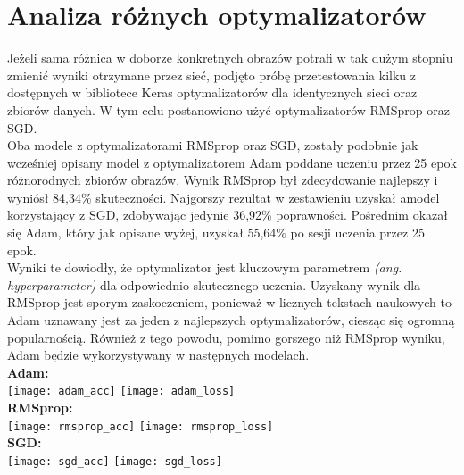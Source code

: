 \section{Analiza różnych optymalizatorów}
Jeżeli sama różnica w doborze konkretnych obrazów potrafi w tak dużym stopniu zmienić wyniki
otrzymane przez sieć, podjęto próbę przetestowania kilku z dostępnych w bibliotece Keras
optymalizatorów dla identycznych sieci oraz zbiorów danych. W tym celu postanowiono użyć
optymalizatorów RMSprop oraz SGD.\\
Oba modele z optymalizatorami RMSprop oraz SGD, zostały podobnie jak wcześniej opisany model
z optymalizatorem Adam poddane uczeniu przez 25 epok różnorodnych zbiorów obrazów. Wynik RMSprop
był zdecydowanie najlepszy i wyniósł 84,34\% skuteczności. Najgorszy rezultat w zestawieniu
uzyskał amodel korzystający z SGD, zdobywając jedynie 36,92\% poprawności. Pośrednim okazał
się Adam, który jak opisane wyżej, uzyskał 55,64\% po sesji uczenia przez 25 epok.\\
Wyniki te dowiodły, że optymalizator jest kluczowym parametrem \textit{(ang. hyperparameter)}
dla odpowiednio skutecznego uczenia. Uzyskany wynik dla RMSprop jest sporym zaskoczeniem,
ponieważ w licznych tekstach naukowych to Adam uznawany jest za jeden z najlepszych
optymalizatorów, ciesząc się ogromną popularnością. Również z tego powodu, pomimo
gorszego niż RMSprop wyniku, Adam będzie wykorzystywany w następnych modelach.\\
\textbf{Adam:}\\
\texttt{[image: adam\_acc]}
\texttt{[image: adam\_loss]}\\
\textbf{RMSprop:}\\
\texttt{[image: rmsprop\_acc]}
\texttt{[image: rmsprop\_loss]}\\
\textbf{SGD:}\\
\texttt{[image: sgd\_acc]}
\texttt{[image: sgd\_loss]}\\

